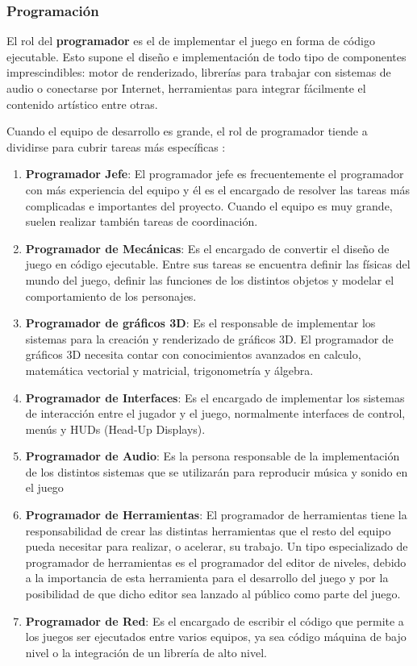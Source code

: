 \subsubsection{Programación}
El rol del \textbf{programador} es el de implementar el juego en forma de código ejecutable. Esto supone el diseño e implementación de todo tipo de componentes imprescindibles: motor de renderizado, librerías para trabajar con sistemas de audio o conectarse por Internet, herramientas para integrar fácilmente el contenido artístico entre otras.

Cuando el equipo de desarrollo es grande, el rol de programador tiende a dividirse para cubrir tareas más específicas \cite{development_and_production}:
\begin{enumerate}
\item \textbf{Programador Jefe}: El programador jefe es frecuentemente el programador con más experiencia del equipo y él es el encargado de resolver las tareas más complicadas e importantes del proyecto. Cuando el equipo es muy grande, suelen realizar también tareas de coordinación.
\item \textbf{Programador de Mecánicas}: Es el encargado de convertir el diseño de juego en código ejecutable. Entre sus tareas se encuentra definir las físicas del mundo del juego, definir las funciones de los distintos objetos y modelar el comportamiento de los personajes.
\item \textbf{Programador de gráficos 3D}: Es el responsable de implementar los sistemas para la creación y renderizado de gráficos 3D. El programador de gráficos 3D necesita contar con conocimientos avanzados en calculo, matemática vectorial y matricial, trigonometría y álgebra.
\item \textbf{Programador de Interfaces}: Es el encargado de implementar los sistemas de interacción entre el jugador y el juego, normalmente interfaces de control, menús y HUDs (Head-Up Displays). 
\item \textbf{Programador de Audio}: Es la persona responsable de la implementación de los distintos sistemas que se utilizarán para reproducir música y sonido en el juego
\item \textbf{Programador de Herramientas}: El programador de herramientas tiene la responsabilidad de crear las distintas herramientas que el resto del equipo pueda necesitar para realizar, o acelerar, su trabajo. Un tipo especializado de programador de herramientas es el programador del editor de niveles, debido a la importancia de esta herramienta para el desarrollo del juego y por la posibilidad de que dicho editor sea lanzado al público como parte del juego.
\item \textbf{Programador de Red}: Es el encargado de escribir el código que permite a los juegos ser ejecutados entre varios equipos, ya sea código máquina de bajo nivel o la integración de un librería de alto nivel.
\end{enumerate}
